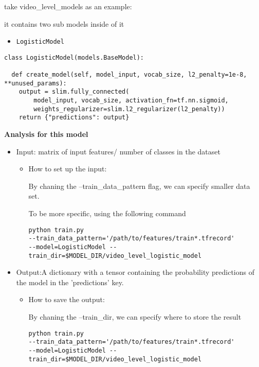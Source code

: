 \documentclass[11pt]{article}
\begin{document}
\begin{enumerate}
take video\_level\_models as an example:

it contains two sub models inside of it

\begin{itemize}
\item \texttt{LogisticModel}
\end{itemize}

\begin{verbatim}
class LogisticModel(models.BaseModel):

  def create_model(self, model_input, vocab_size, l2_penalty=1e-8,
**unused_params):
    output = slim.fully_connected(
        model_input, vocab_size, activation_fn=tf.nn.sigmoid,
        weights_regularizer=slim.l2_regularizer(l2_penalty))
    return {"predictions": output}
\end{verbatim}

\textbf{Analysis for this model}

\begin{itemize}
\item Input: matrix of input features/ number of classes in the dataset
\begin{itemize}
\item How to set up the input:

By chaning the --train\_data\_pattern flag, we can specify smaller data set.

To be more specific, using the following command

\begin{verbatim}
python train.py
--train_data_pattern='/path/to/features/train*.tfrecord'
--model=LogisticModel --train_dir=$MODEL_DIR/video_level_logistic_model
\end{verbatim}
\end{itemize}
\end{itemize}


\begin{itemize}
\item Output:A dictionary with a tensor containing the probability predictions of the model in the 'predictions' key.
\begin{itemize}
\item How to save the output:

By chaning the --train\_dir, we can specify where to store the result
\begin{verbatim}
python train.py
--train_data_pattern='/path/to/features/train*.tfrecord'
--model=LogisticModel --train_dir=$MODEL_DIR/video_level_logistic_model
\end{verbatim}
\end{itemize}


\end{itemize}
\end{enumerate}
\end{document}

